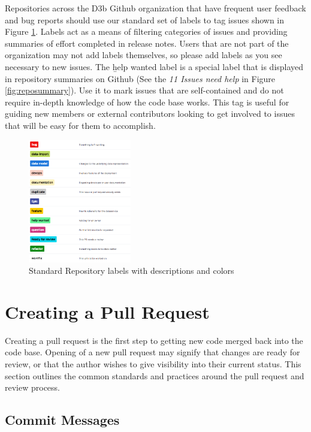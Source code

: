 \documentclass[a4paper,12pt,titlepage]{scrartcl}
\begin{document}
	Repositories across the D3b Github organization that have frequent user feedback and bug reports should use our standard set of labels to tag issues shown in Figure \ref{fig:labels}.
	Labels act as a means of filtering categories of issues and providing summaries of effort completed in release notes.
	Users that are not part of the organization may not add labels themselves, so please add labels as you see necessary to new issues.
	The {\b help wanted} label is a special label that is displayed in repository summaries on Github (See the {\em 11 Issues need help} in Figure \ref{fig:reposummary}).
	Use it to mark issues that are self-contained and do not require in-depth knowledge of how the code base works.
	This tag is useful for guiding new members or external contributors looking to get involved to issues that will be easy for them to accomplish.
   
  	\begin{figure}[h]
  			\centering
    			\includegraphics[width=0.4\textwidth]{images/labels.png}
    			\caption{Standard Repository labels with descriptions and colors}
    			\label{fig:labels}
   	\end{figure}
   
	\section{Creating a Pull Request}\label{prprocess}
	
	Creating a pull request is the first step to getting new code merged back into the code base.
	Opening of a new pull request may signify that changes are ready for review, or that the author wishes to give visibility into their current status.
	This section outlines the common standards and practices around the pull request and review process.
	
	\subsection{Commit Messages}\label{commits}
	
\end{document}
